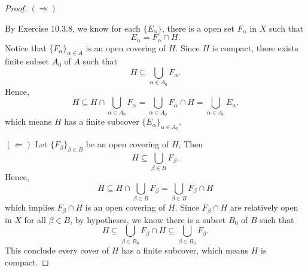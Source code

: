 \begin{Exercise}
\begin{proof}
$(\Longrightarrow)$

By Exercise 10.3.8, we know for each $\{E_{\alpha}\}$, there is a open set $F_{\alpha}$ in $X$ such that
$$
E_{\alpha} = F_{\alpha}\cap H.
$$
Notice that $\{F_{\alpha}\}_{\alpha\in A}$ is an open covering of $H$.
Since $H$ is compact, there exists finite subset $A_0$ of $A$ such that
$$
H \subseteq \bigcup_{\alpha\in A_0} F_{\alpha}.
$$
Hence,
$$
H 
\subseteq H\cap\bigcup_{\alpha\in A_0} F_{\alpha}
= \bigcup_{\alpha\in A_0} F_{\alpha} \cap H
= \bigcup_{\alpha\in A_0} E_{\alpha}.
$$
which means $H$ has a finite subcover $\{E_{\alpha}\}_{\alpha\in A_0}$.

\vspace{2ex}

$(\Longleftarrow)$
Let $\{F_{\beta}\}_{\beta\in B}$ be an open covering of $H$, Then
$$
H \subseteq \bigcup_{\beta\in B} F_{\beta}.
$$
Hence,
$$
H
\subseteq H\cap\bigcup_{\beta\in B}F_{\beta} 
= \bigcup_{\beta\in B}F_{\beta} \cap H
$$
which implies $F_{\beta} \cap H$ is an open covering of $H$. Since $F_{\beta} \cap H$ are relatively open in $X$ for all $\beta\in B$, by hypotheses, we know there is a subset $B_0$ of $B$ such that
$$
H
\subseteq \bigcup_{\beta\in B_0}F_{\beta} \cap H
\subseteq \bigcup_{\beta\in B_0}F_{\beta}.
$$
This conclude every cover of $H$ has a finite subcover, which means $H$ is compact.
\end{proof}
\end{Exercise}
